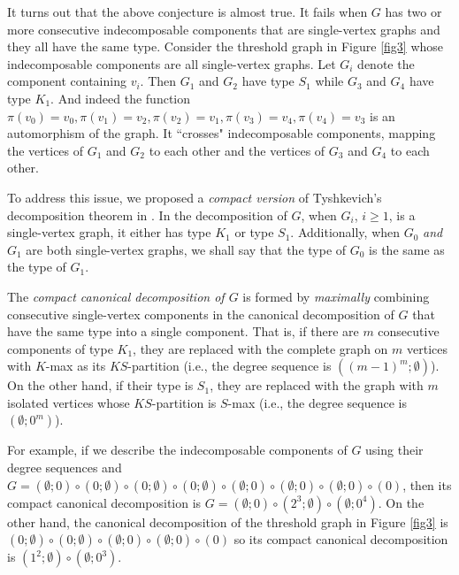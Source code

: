 \documentclass[11pt]{article}
\begin{document}
 It turns out that the above conjecture is almost true.  It fails when $G$ has two or more consecutive indecomposable components that  are single-vertex graphs and they all have the same type.  Consider the threshold graph  in Figure \ref{fig3} whose indecomposable components are all single-vertex graphs.  Let $G_i$ denote the component containing  $v_i$.  Then $G_1$ and $G_2$ have type $S_1$ while $G_3$ and $G_4$ have type $K_1$.   And indeed the function $\pi(v_0) = v_0, \pi(v_1) = v_2, \pi(v_2) = v_1, \pi(v_3) = v_4, \pi(v_4) = v_3$ is an automorphism  of the graph.  It ``crosses" indecomposable components, mapping the vertices of $G_1$ and $G_2$ to each other and the vertices of $G_3$ and $G_4$ to each other. 

To address this issue, we proposed a {\it compact version} of Tyshkevich's decomposition theorem in \cite{Ch25}.   In the decomposition of $G$, when $G_i$, $i \ge 1$, is a single-vertex graph, it either has type $K_1$ or type $S_1$.  Additionally, when $G_0$ {\it and} $G_1$ are both single-vertex graphs, we shall say that the type of $G_0$ is the same as the type of $G_1$.  


The {\it compact canonical decomposition of $G$} is formed by {\it maximally} combining consecutive single-vertex components in 
the canonical decomposition of $G$ that have the same type into a single component.
That is, if there are $m$ consecutive components of type $K_1$, they are replaced with 
the complete graph on $m$ vertices with $K$-max as its $KS$-partition (i.e., the degree sequence is $((m-1)^m; \emptyset)$).  On the other hand, if their type is $S_1$, they are replaced with
the graph with $m$ isolated vertices whose $KS$-partition is $S$-max (i.e., the degree sequence is $(\emptyset; 0^m)$).


For example, if we describe the indecomposable components of $G$ using their degree sequences and 
$G = (\emptyset; 0) \circ (0; \emptyset) \circ (0; \emptyset) \circ (0; \emptyset) \circ (\emptyset; 0) \circ (\emptyset; 0) \circ (\emptyset; 0) \circ (0)$, then its compact canonical decomposition is $G = (\emptyset; 0) \circ(2^3; \emptyset) \circ (\emptyset; 0^4)$. On the other hand,  the canonical decomposition of the threshold graph in Figure \ref{fig3} is $(0; \emptyset) \circ (0; \emptyset) \circ (\emptyset; 0) \circ (\emptyset; 0) \circ (0)$ so its compact canonical decomposition is $(1^2;  \emptyset) \circ (\emptyset; 0^3)$.
\end{document}
